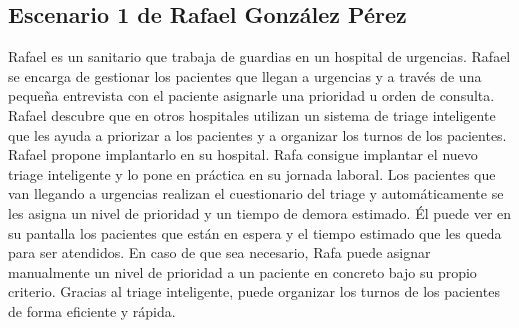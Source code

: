 \subsection{Escenario 1 de Rafael González Pérez}
    Rafael es un sanitario que trabaja de guardias en un hospital de urgencias. Rafael se encarga
    de gestionar los pacientes que llegan a urgencias y a través de una pequeña entrevista con el paciente asignarle
    una prioridad u orden de consulta. Rafael descubre que en otros hospitales utilizan un sistema de triage inteligente
    que les ayuda a priorizar a los pacientes y a organizar los turnos de los pacientes. Rafael propone implantarlo en su hospital.
    Rafa consigue implantar el nuevo triage inteligente y lo pone en práctica en su jornada laboral. Los pacientes que van llegando
    a urgencias realizan el cuestionario del triage y automáticamente se les asigna un nivel de prioridad y un tiempo de demora estimado.
    Él puede ver en su pantalla los pacientes que están en espera y el tiempo estimado que les queda para ser atendidos. En caso
    de que sea necesario, Rafa puede asignar manualmente un nivel de prioridad a un paciente en concreto bajo su propio criterio.
    Gracias al triage inteligente, puede organizar los turnos de los pacientes de forma eficiente y rápida.


